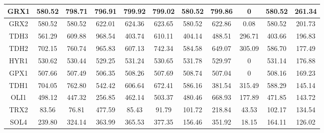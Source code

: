 \begin{table}[H]
\begin{center}
{\begin{tabular}{|c|c|c|c|c|c|c|c|c|c|c|}
%
GRX1            & 580.52             & 798.71             & 796.91            & 799.92                     & 799.02        & 580.52          & 799.86                 & 0               & 580.52            & 261.34       \\ \hline
GRX2            & 580.52             & 580.52             & 622.01            & 624.36                     & 623.65        & 580.52          & 622.86                 & 0.08            & 580.52            & 201.73       \\ \hline
TDH3            & 561.29             & 609.88             & 968.54            & 403.74                     & 610.11        & 404.14          & 488.51                 & 296.71          & 403.66            & 196.83       \\ \hline
TDH2            & 702.15             & 760.74             & 965.83            & 607.13                     & 742.34        & 584.58          & 649.07                 & 305.09          & 586.70            & 177.49       \\ \hline
HYR1            & 530.62             & 530.44             & 529.25            & 531.24                     & 530.65        & 531.78          & 529.97                 & 0               & 531.14            & 176.88       \\ \hline
GPX1            & 507.66             & 507.49             & 506.35            & 508.26                     & 507.69        & 508.74          & 507.04                 & 0               & 508.16            & 169.23       \\ \hline
TDH1            & 704.05             & 762.80             & 542.42            & 606.64                     & 672.41        & 586.16          & 381.54                 & 315.49          & 588.29            & 145.14       \\ \hline
OLI1            & 498.12             & 447.32             & 256.85            & 462.14                     & 503.37        & 480.46          & 668.93                 & 177.89          & 471.85            & 143.72       \\ \hline
TRX2            & 83.56              & 76.81              & 477.59            & 85.43                      & 91.79         & 101.72          & 218.84                 & 43.53           & 102.17            & 134.54       \\ \hline
SOL4            & 239.80             & 324.14             & 363.99            & 365.53                     & 377.35        & 156.46          & 351.92                 & 18.15           & 164.11            & 126.02       \\ \hline

\end{tabular}}
\end{center}
\end{table}
